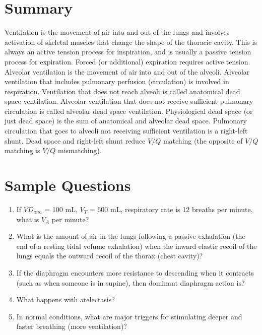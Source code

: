 \section{Summary}
Ventilation is the movement of air into and out of the lungs and involves activation of skeletal muscles that change the shape of the thoracic cavity. This is always an active tension process for inspiration, and is usually a passive tension process for expiration. Forced (or additional) expiration requires active tension. 
Alveolar ventilation is the movement of air into and out of the alveoli. Alveolar ventilation that includes pulmonary perfusion (circulation) is involved in respiration. Ventilation that does not reach alveoli is called anatomical dead space ventilation. Alveolar ventilation that does not receive sufficient pulmonary circulation is called alveolar dead space ventilation. Physiological dead space (or just dead space) is the sum of anatomical and alveolar dead space. Pulmonary circulation that goes to alveoli not receiving sufficient ventilation is a right-left shunt. Dead space and right-left shunt reduce $V/Q$ matching (the opposite of $V/Q$ matching is $V/Q$ mismatching). 


\printbibliography[heading=subbibintoc]

\section*{Sample Questions}

\begin{enumerate}
    \item If $VD_{ana}$ = 100 mL, $V_T$ = 600 mL, respiratory rate is 12 breaths per minute, what is $V_A$ per minute?
    \item What is the amount of air in the lungs following a passive exhalation (the end of a resting tidal volume exhalation) when the inward elastic recoil of the lungs equals the outward recoil of the thorax (chest cavity)?
    \item If the diaphragm encounters more resistance to descending when it contracts (such as when someone is in supine), then dominant diaphragm action is?
    \item What happens with atelectasis?
    \item In normal conditions, what are major triggers for stimulating deeper and faster breathing (more ventilation)?
\end{enumerate} 